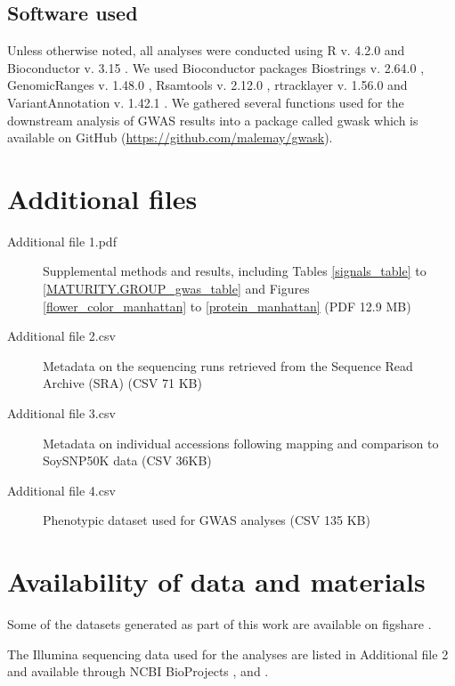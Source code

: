 \subsection*{Software used}
\label{sv-gwas-software-used}

Unless otherwise noted, all analyses were conducted using R v. 4.2.0
\citep{r2022} and Bioconductor v. 3.15 \citep{huber2015}. We used Bioconductor
packages Biostrings v. 2.64.0 \citep{pages2022}, GenomicRanges v. 1.48.0
\citep{lawrence2013}, Rsamtools v. 2.12.0 \citep{rsamtools2022}, rtracklayer v.
1.56.0 \citep{lawrence2009} and VariantAnnotation v. 1.42.1
\citep{obenchain2014}.  We gathered several functions used for the downstream
analysis of GWAS results into a package called gwask which is available on
GitHub (\url{https://github.com/malemay/gwask}).

\section*{Additional files}
\label{sv-gwas-additional-files}

\begin{description}
	\item[Additional file 1.pdf] Supplemental methods and results,
		including Tables \ref{signals_table} to \ref{MATURITY.GROUP_gwas_table}
		and Figures \ref{flower_color_manhattan} to \ref{protein_manhattan}
		(PDF 12.9 MB)
	\item[Additional file 2.csv] Metadata on the sequencing runs retrieved
		from the Sequence Read Archive (SRA) (CSV 71 KB)
	\item[Additional file 3.csv] Metadata on individual accessions following mapping
		and comparison to SoySNP50K data (CSV 36KB)
	\item[Additional file 4.csv] Phenotypic dataset used for GWAS analyses (CSV 135
		KB)
\end{description}

\section*{Availability of data and materials}
\label{sv-gwas-availability}

Some of the datasets generated as part of this work are available on figshare
\citep{kmer-gwas-figshare}.

The Illumina sequencing data used for the analyses are listed in Additional file 2
and available through NCBI BioProjects \citeauthor{PRJNA257011}, \citeauthor{PRJNA289660}
and \citeauthor{PRJNA639876}.

